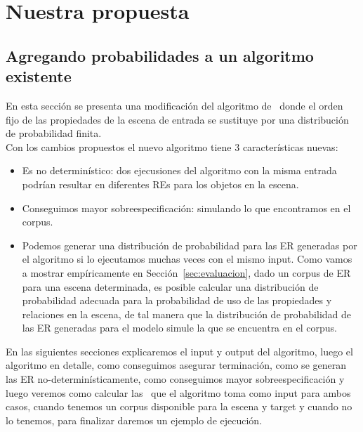 \chapter{Nuestra propuesta}
\label{sec:algoritmo}
\section{Agregando probabilidades a un algoritmo existente}

En esta secci\'on se presenta una modificaci\'on del algoritmo
de~\cite{arec2:2008:Areces} donde el orden fijo de las propiedades de
la escena de entrada se sustituye por una distribuci\'on de probabilidad finita. \\


Con los cambios propuestos el nuevo algoritmo tiene 3 caracter\'isticas nuevas:
\begin{itemize}
 \item Es no determin\'istico: dos ejecusiones del algoritmo con la
misma entrada podr\'{i}an resultar en diferentes REs para los objetos en la escena.\\

 \item Conseguimos mayor sobreespecificaci\'on: simulando lo que encontramos en el corpus.\\

 \item Podemos generar una distribuci\'on de probabilidad
para las ER generadas por el algoritmo si lo ejecutamos muchas veces con
el mismo input. Como vamos a mostrar emp\'{i}ricamente en
Secci\'on~\ref{sec:evaluacion}, dado un corpus de ER para una escena determinada,
es posible calcular una distribuci\'on de probabilidad adecuada para la
probabilidad de uso de las propiedades y relaciones en la escena, de tal manera que
la distribuci\'on de probabilidad de las ER generadas para el modelo
simule la que se encuentra en el corpus.\\
\end{itemize}

En las siguientes secciones explicaremos el input y output del algoritmo, luego el algoritmo en detalle, como conseguimos asegurar terminaci\'on, como se generan las ER no-determin\'isticamente, como conseguimos mayor sobreespecificaci\'on y luego veremos como calcular las \puse\ que el algoritmo toma como input para ambos casos, cuando tenemos un corpus disponible para la escena y target y cuando no lo tenemos, para finalizar daremos un ejemplo de ejecuci\'on.

